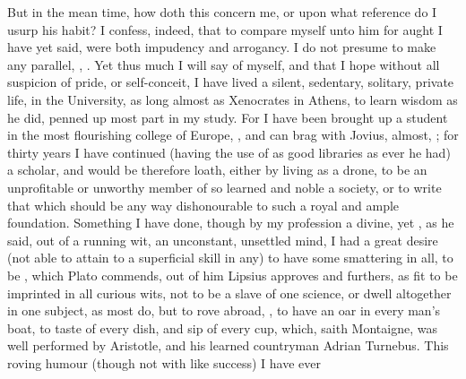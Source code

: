 {But in the mean time, how doth this concern me, or upon what reference
do I usurp his habit? I confess, indeed, that to compare myself unto
him for aught I have yet said, were both impudency and arrogancy. I do
not presume to make any parallel, , . Yet thus much I
will say of myself, and that I hope without all suspicion of pride, or
self-conceit, I have lived a silent, sedentary, solitary, private life,
 in the University, as long almost as Xenocrates in
Athens,  to learn wisdom as he did, penned up most part
in my study. For I have been brought up a student in the most
flourishing college of Europe,  , and can brag
with Jovius, almost, ; for thirty years I
have continued (having the use of as good libraries as ever he had)
a scholar, and would be therefore loath, either by living as a drone,
to be an unprofitable or unworthy member of so learned and noble a
society, or to write that which should be any way dishonourable to such
a royal and ample foundation. Something I have done, though by my
profession a divine, yet , as he said, out of
a running wit, an unconstant, unsettled mind, I had a great desire (not
able to attain to a superficial skill in any) to have some smattering
in all, to be ,  which
Plato commends, out of him Lipsius approves and furthers, as
fit to be imprinted in all curious wits, not to be a slave of one
science, or dwell altogether in one subject, as most do, but to rove
abroad, , to have an oar in every man's boat, to 
taste of every dish, and sip of every cup, which, saith Montaigne,
was well performed by Aristotle, and his learned countryman Adrian
Turnebus. This roving humour (though not with like success) I have ever
}

